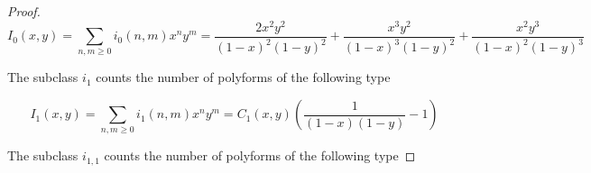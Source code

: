 \documentclass[12pt]{article}
\theoremstyle{plain}
\theoremstyle{definition}
\theoremstyle{remark}
\theoremstyle{definition}
\newcommand{\cellw}[4]{\draw[thick] ( #1 , #2 ) rectangle ( #3 , #4 );}
\newcommand{\cellb}[4]{\filldraw[black!60] ( #1 , #2 ) rectangle ( #3 , #4 ); \draw[thick] ( #1 , #2 ) rectangle ( #3 , #4 );}
\begin{document}
\begin{proof}
\begin{equation*}
    I_0(x,y) = \sum_{n,m \geq 0}i_0(n,m)x^n y^m = \frac{2 x^2 y^2}{(1-x)^2 (1-y)^2} + \frac{x^3 y^2}{(1-x)^3(1-y)^2} + \frac{x^2 y^3}{(1-x)^2 (1-y)^3}
\end{equation*}

The subclass $i_1$ counts the number of polyforms of the following type

\begin{center}
\end{center}

\begin{equation*}
    I_1(x,y) = \sum_{n,m \geq 0} i_1(n,m)x^n y^m = C_1(x,y)\left(\frac{1}{(1-x)(1-y)}-1\right)
\end{equation*}

The subclass $i_{1,1}$ counts the number of polyforms of the following type


\end{proof}
\end{document}
